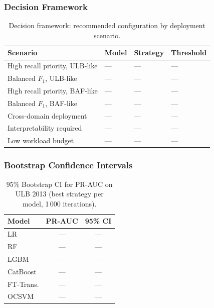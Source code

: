 \subsubsection{Decision Framework}

\begin{table}[ht]
\centering
\caption{Decision framework: recommended configuration by deployment scenario.}
\label{tab:decision_framework}
\begin{tabular}{l l l l}
\toprule
Scenario & Model & Strategy & Threshold \\
\midrule
High recall priority, ULB-like  & ---      & ---      & ---       \\
Balanced $F_1$, ULB-like        & ---      & ---      & ---       \\
High recall priority, BAF-like  & ---      & ---      & ---       \\
Balanced $F_1$, BAF-like        & ---      & ---      & ---       \\
Cross-domain deployment         & ---      & ---      & ---       \\
Interpretability required       & ---      & ---      & ---       \\
Low workload budget             & ---      & ---      & ---       \\
\bottomrule
\end{tabular}
\end{table}

\subsubsection{Bootstrap Confidence Intervals}

\begin{table}[ht]
\centering
\caption{95\% Bootstrap CI for PR-AUC on ULB 2013 (best strategy per model, 1\,000 iterations).}
\label{tab:ci_ulb}
\begin{tabular}{l c c}
\toprule
Model & PR-AUC & 95\% CI \\
\midrule
LR        & --- & --- \\
RF        & --- & --- \\
LGBM      & --- & --- \\
CatBoost  & --- & --- \\
FT-Trans. & --- & --- \\
OCSVM     & --- & --- \\
\bottomrule
\end{tabular}
\end{table}

